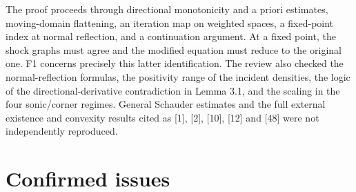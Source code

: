 \documentclass[10pt]{article}
\begin{document}
The proof proceeds through directional monotonicity and a priori estimates, moving-domain flattening, an iteration map on weighted spaces, a fixed-point index at normal reflection, and a continuation argument. At a fixed point, the shock graphs must agree and the modified equation must reduce to the original one. F1 concerns precisely this latter identification. The review also checked the normal-reflection formulas, the positivity range of the incident densities, the logic of the directional-derivative contradiction in Lemma 3.1, and the scaling in the four sonic/corner regimes. General Schauder estimates and the full external existence and convexity results cited as [1], [2], [10], [12] and [48] were not independently reproduced.\par
\section*{Confirmed issues}
\end{document}
